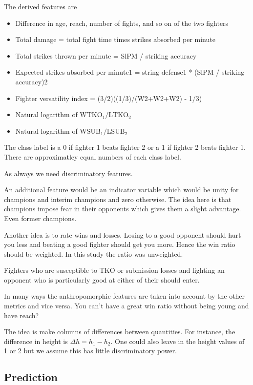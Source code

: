 \noindent
The derived features are

\begin{itemize}[noitemsep]
  \item Difference in age, reach, number of fights, and so on of the two fighters
  \item Total damage = total fight time times strikes absorbed per minute
  \item Total strikes thrown per minute = SlPM / striking accuracy
  \item Expected strikes absorbed per minute1 = string defense1 * (SlPM / striking accuracy)2
  \item Fighter versatility index = (3/2)((1/3)/(W2+W2+W2) - 1/3)
  \item Natural logarithm of $\textrm{WTKO}_1/\textrm{LTKO}_2$
  \item Natural logarithm of $\textrm{WSUB}_1/\textrm{LSUB}_2$
\end{itemize}

The class label is a 0 if fighter 1 beats fighter 2 or
a 1 if fighter 2 beats fighter 1.
There are approximatley
equal numbers of each class label.

As always we need discriminatory features.

An additional feature would be an indicator variable
which would be unity for champions and interim champions
and zero otherwise. The idea here is that champions
impose fear in their opponents which gives them a slight
advantage. Even former champions.

Another idea is to rate wins and losses. Losing to a good
opponent should hurt you less and beating a good fighter
should get you more. Hence the win ratio should be
weighted. In this study the ratio was unweighted.

Fighters who are susceptible to TKO or submission
losses and fighting an opponent who is particularly
good at either of their should enter.

In many ways the anthropomorphic features are taken
into account by the other metrics and vice versa.
You can't have a great win ratio without being
young and have reach?

The idea is make columns of differences between
quantities. For instance, the difference in
height is $\Delta h = h_1 - h_2$. One could also leave
in the height values of 1 or 2 but we assume this has
little discriminatory power.

\subsection*{Prediction}

